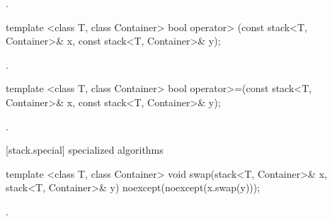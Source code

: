 \begin{itemdescr}
\pnum
\returns
{}.
\end{itemdescr}

%
\begin{itemdecl}
template <class T, class Container>
  bool operator> (const stack<T, Container>& x, const stack<T, Container>& y);
\end{itemdecl}

\begin{itemdescr}
\pnum
\returns
{}.
\end{itemdescr}

%
\begin{itemdecl}
template <class T, class Container>
    bool operator>=(const stack<T, Container>& x, const stack<T, Container>& y);
\end{itemdecl}

\begin{itemdescr}
\pnum
\returns
{}.
\end{itemdescr}

[stack.special]{ specialized algorithms}

%
%
\begin{itemdecl}
template <class T, class Container>
  void swap(stack<T, Container>& x, stack<T, Container>& y) noexcept(noexcept(x.swap(y)));
\end{itemdecl}

\begin{itemdescr}
\pnum
\effects {}.
\end{itemdescr}

